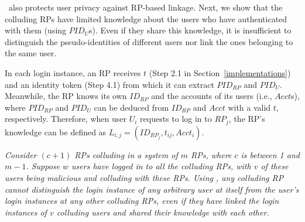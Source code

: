 {{%


\usso~also protects user privacy against RP-based linkage. Next, we show that the colluding RPs have limited knowledge about the users who have authenticated with them (using $PID_U$s). Even if they share this knowledge, it is insufficient to distinguish the pseudo-identities of different users nor link the ones belonging to the same user.

In each login instance, an RP receives $t$ (Step 2.1 in Section~\ref{implementations}) and an identity token (Step 4.1) from which it can extract $PID_{RP}$ and $PID_U$. Meanwhile, the RP knows its own $ID_{RP}$ and the accounts of its users (i.e., $Acct$s), %
where $PID_{RP}$ and $PID_U$ can be deduced from $ID_{RP}$ and $Acct$ with a valid $t$, respectively. Therefore, when user $U_i$ requests to log in to $RP_j$, the RP's knowledge can be defined as $L_{i, j}=(ID_{RP_j}, t_{ij}, Acct_i)$. %

\vspace{1mm}
 {\em Consider $(c+1)$ RPs colluding in a system of $m$ RPs, where $c$ is between 1 and $m-1$. Suppose $w$ users have logged in to all the colluding RPs, with $v$ of these users being malicious and colluding with these RPs.
Using \usso, any colluding RP cannot distinguish the login instance of any arbitrary user at itself from the user's login instances at any other colluding RPs, even if they have linked the login instances of $v$ colluding users and shared their knowledge with each other.}

}}

